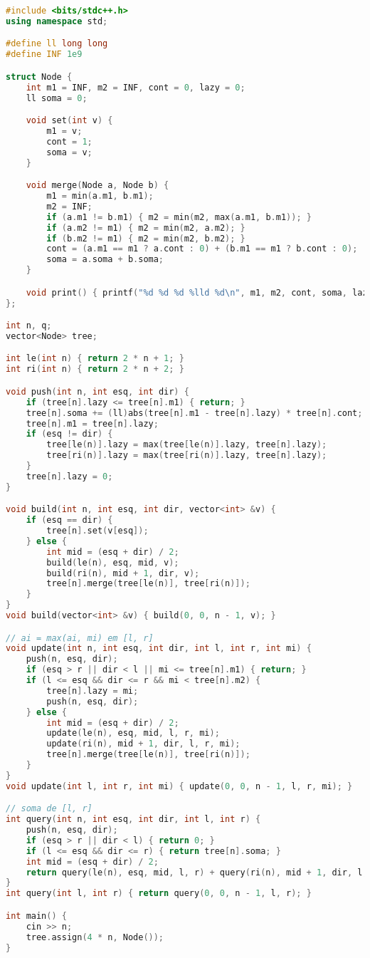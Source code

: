 \documentclass[11pt, a4paper, twoside]{article}
\begin{document}
\begin{lstlisting}[language=C++]
#include <bits/stdc++.h>
using namespace std;

#define ll long long
#define INF 1e9

struct Node {
    int m1 = INF, m2 = INF, cont = 0, lazy = 0;
    ll soma = 0;

    void set(int v) {
        m1 = v;
        cont = 1;
        soma = v;
    }

    void merge(Node a, Node b) {
        m1 = min(a.m1, b.m1);
        m2 = INF;
        if (a.m1 != b.m1) { m2 = min(m2, max(a.m1, b.m1)); }
        if (a.m2 != m1) { m2 = min(m2, a.m2); }
        if (b.m2 != m1) { m2 = min(m2, b.m2); }
        cont = (a.m1 == m1 ? a.cont : 0) + (b.m1 == m1 ? b.cont : 0);
        soma = a.soma + b.soma;
    }

    void print() { printf("%d %d %d %lld %d\n", m1, m2, cont, soma, lazy); }
};

int n, q;
vector<Node> tree;

int le(int n) { return 2 * n + 1; }
int ri(int n) { return 2 * n + 2; }

void push(int n, int esq, int dir) {
    if (tree[n].lazy <= tree[n].m1) { return; }
    tree[n].soma += (ll)abs(tree[n].m1 - tree[n].lazy) * tree[n].cont;
    tree[n].m1 = tree[n].lazy;
    if (esq != dir) {
        tree[le(n)].lazy = max(tree[le(n)].lazy, tree[n].lazy);
        tree[ri(n)].lazy = max(tree[ri(n)].lazy, tree[n].lazy);
    }
    tree[n].lazy = 0;
}

void build(int n, int esq, int dir, vector<int> &v) {
    if (esq == dir) {
        tree[n].set(v[esq]);
    } else {
        int mid = (esq + dir) / 2;
        build(le(n), esq, mid, v);
        build(ri(n), mid + 1, dir, v);
        tree[n].merge(tree[le(n)], tree[ri(n)]);
    }
}
void build(vector<int> &v) { build(0, 0, n - 1, v); }

// ai = max(ai, mi) em [l, r]
void update(int n, int esq, int dir, int l, int r, int mi) {
    push(n, esq, dir);
    if (esq > r || dir < l || mi <= tree[n].m1) { return; }
    if (l <= esq && dir <= r && mi < tree[n].m2) {
        tree[n].lazy = mi;
        push(n, esq, dir);
    } else {
        int mid = (esq + dir) / 2;
        update(le(n), esq, mid, l, r, mi);
        update(ri(n), mid + 1, dir, l, r, mi);
        tree[n].merge(tree[le(n)], tree[ri(n)]);
    }
}
void update(int l, int r, int mi) { update(0, 0, n - 1, l, r, mi); }

// soma de [l, r]
int query(int n, int esq, int dir, int l, int r) {
    push(n, esq, dir);
    if (esq > r || dir < l) { return 0; }
    if (l <= esq && dir <= r) { return tree[n].soma; }
    int mid = (esq + dir) / 2;
    return query(le(n), esq, mid, l, r) + query(ri(n), mid + 1, dir, l, r);
}
int query(int l, int r) { return query(0, 0, n - 1, l, r); }

int main() {
    cin >> n;
    tree.assign(4 * n, Node());
}
\end{lstlisting}
\end{document}
